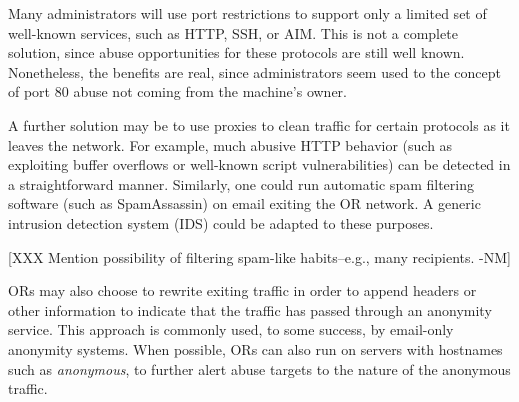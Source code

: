 \documentclass[times,10pt,twocolumn]{article}
\begin{document}


Many administrators will use port restrictions to support only a
limited set of well-known services, such as HTTP, SSH, or AIM.
This is not a complete solution, since abuse opportunities for these
protocols are still well known.  Nonetheless, the benefits are real,
since administrators seem used to  the concept of port 80 abuse not
coming from the machine's owner.

A further solution may be to use proxies to clean traffic for certain
protocols as it leaves the network.  For example, much abusive HTTP
behavior (such as exploiting buffer overflows or well-known script
vulnerabilities) can be detected in a straightforward manner.
Similarly, one could run automatic spam filtering software (such as
SpamAssassin) on email exiting the OR network.  A generic
intrusion detection system (IDS) could be adapted to these purposes.

[XXX Mention possibility of filtering spam-like habits--e.g., many
  recipients. -NM]

ORs may also choose to rewrite exiting traffic in order to append
headers or other information to indicate that the traffic has passed
through an anonymity service.  This approach is commonly used, to some
success, by email-only anonymity systems.  When possible, ORs can also
run on servers with hostnames such as {\it anonymous}, to further
alert abuse targets to the nature of the anonymous traffic.

\end{document}
